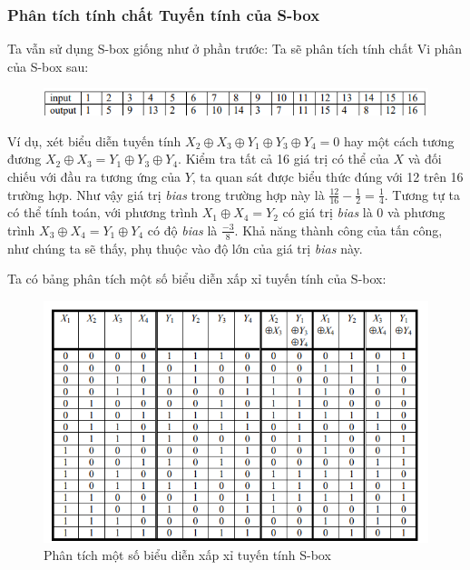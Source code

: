 \subsubsection{Phân tích tính chất Tuyến tính của S-box}
Ta vẫn sử dụng S-box giống như ở phần trước:
Ta sẽ phân tích tính chất Vi phân của S-box sau:
\begin{figure}[H]
    \centering
    \includegraphics[scale=0.9]{Các công cụ và kĩ thuật sử dụng trong tấn công/S-boz.png}
\end{figure}
Ví dụ, xét biểu diễn tuyến tính $X_2 \oplus X_3 \oplus Y_1 \oplus Y_3 \oplus Y_4 = 0$ hay một cách tương đương $ X_2 \oplus  X_3 = Y_1 \oplus Y_3 \oplus Y_4.$ Kiểm tra tất cả 16 giá trị có thể của $X$ và đối chiếu với đầu ra tương ứng của $Y$, ta quan sát được biểu thức đúng với 12 trên 16 trường hợp. Như vậy giá trị \emph{bias} trong trường hợp này là $\frac{12}{16}-\frac{1}{2} = \frac{1}{4}.$ Tương tự ta có thể tính toán, với phương trình $X_1 \oplus X_4 = Y_2$ có giá trị \emph{bias} là 0 và phương trình $X_3 \oplus X_4 = Y_1 \oplus Y_4$ có độ \emph{bias} là $\frac{-3}{8}.$
Khả năng thành công của tấn công, như chúng ta sẽ thấy, phụ thuộc vào độ lớn của giá trị \emph{bias} này.

Ta có bảng phân tích một số biểu diễn xấp xỉ tuyến tính  của S-box:
 \begin{figure}
    \centering
    \includegraphics[scale = 0.9]{Các công cụ và kĩ thuật sử dụng trong tấn công/sample linear sbox.png}
    \caption{Phân tích một số biểu diễn xấp xỉ tuyến tính S-box}
    
    \end{figure}

